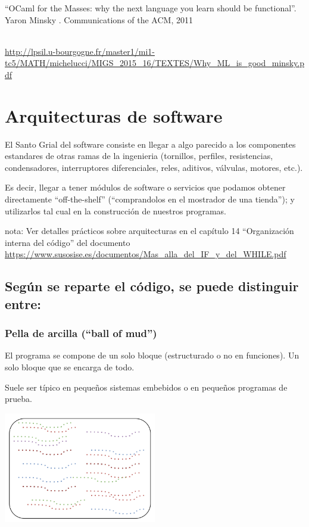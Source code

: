 \documentclass[spanish,12pt,a4paper,final,oneside]{book}
\begin{document}
``OCaml for the Masses: why the next language you learn should be functional''. Yaron Minsky . Communications of the ACM, 2011
\begin{tiny}
\\ \url{http://lpsil.u-bourgogne.fr/master1/mi1-tc5/MATH/michelucci/MIGS_2015_16/TEXTES/Why_ML_is_good_minsky.pdf}
\end{tiny}




\section{Arquitecturas de software}

El Santo Grial del software consiste en llegar a algo parecido a los componentes estandares de otras ramas de la ingenieria (tornillos, perfiles, resistencias, condensadores, interruptores diferenciales, reles, aditivos, válvulas, motores, etc.). 

Es decir, llegar a tener módulos de software o servicios que podamos obtener directamente ``off-the-shelf'' (``comprandolos en el mostrador de una tienda''); y utilizarlos tal cual en la construcción de nuestros programas.

nota: \footnotesize{Ver detalles prácticos sobre arquitecturas en el capítulo 14 ``Organización interna del código'' del documento \url{https://www.susosise.es/documentos/Mas_alla_del_IF_y_del_WHILE.pdf}}


\subsection{Según se reparte el código, se puede distinguir entre:}


\subsubsection{Pella de arcilla (``ball of mud'')}
El programa se compone de un solo bloque (estructurado o no en funciones). Un solo bloque que se encarga de todo.

Suele ser típico en pequeños sistemas embebidos o en pequeños programas de prueba.

\begin{center}
\includegraphics[width=0.5\textwidth]{arquitectura - ball of mud}
\end{center}
\end{document}

